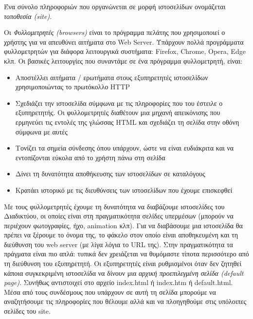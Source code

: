 Ένα σύνολο πληροφοριών που οργανώνεται σε μορφή ιστοσελίδων ονομάζεται \emph{τοποθεσία (site)}.

Οι \emph{Φυλλομετρητές (browsers)} είναι το πρόγραμμα πελάτης που χρησιμοποιεί ο χρήστης για να απευθύνει αιτήματα στο Web Server. Υπάρχουν πολλά προγράμματα φυλλομετρητών για διάφορα λειτουργικά συστήματα: Firefox, Chrome, Opera, Edge κλπ. Οι βασικές λειτουργίες που συναντάμε σε ένα πρόγραμμα φυλλομετρητή, είναι:

\begin{itemize}
\item Αποστέλλει αιτήματα / ερωτήματα στους εξυπηρετητές ιστοσελίδων χρησιμοποιώντας το πρωτόκολλο HTTP
\item Σχεδιάζει την ιστοσελίδα σύμφωνα με τις πληροφορίες που του έστειλε ο εξυπηρετητής. Οι φυλλομετρητές διαθέτουν μια μηχανή απεικόνισης που ερμηνεύει τις εντολές της γλώσσας HTML και σχεδιάζει τη σελίδα στην οθόνη σύμφωνα με αυτές
\item Τονίζει τα σημεία σύνδεσης όπου υπάρχουν, ώστε να είναι ευδιάκριτα και να εντοπίζονται εύκολα από το χρήστη πάνω στη σελίδα
\item Δίνει τη δυνατότητα αποθήκευσης των ιστοσελίδων σε καταλόγους
\item Κρατάει ιστορικό με τις διευθύνσεις των ιστοσελίδων που έχουμε επισκεφθεί
\end{itemize}

Με τους φυλλομετρητές έχουμε τη δυνατότητα να διαβάζουμε ιστοσελίδες του Διαδικτύου, οι οποίες είναι στη πραγματικότητα σελίδες υπερμέσων (μπορούν να περιέχουν φωτογραφίες, ήχο, animation κλπ). Για να διαβάσουμε μια ιστοσελίδα θα πρέπει να ξέρουμε το όνομα της, το φάκελο στον οποίο είναι αποθηκευμένη και τη διεύθυνση του web server (με λίγα λόγια το URL της). Στην πραγματικότητα τα πράγματα είναι πιο απλά: τυπικά δεν χρειάζεται να θυμόμαστε τίποτα περισσότερο από τη διεύθυνση του εξυπηρετητή. Οι εξυπηρετητές είναι ρυθμισμένοι όταν δεν ζητηθεί κάποια συγκεκριμένη ιστοσελίδα να δίνουν μια \emph{αρχική προεπιλεγμένη σελίδα (default page)}. Συνήθως αντιστοιχεί στο αρχείο index.html ή index.htm ή default.html. Μέσα από τους συνδέσμους που υπάρχουν σε αυτή τη σελίδα μπορούμε να αναζητήσουμε τις πληροφορίες που θέλουμε αλλά και να πλοηγηθούμε στις υπόλοιπες σελίδες του site.
